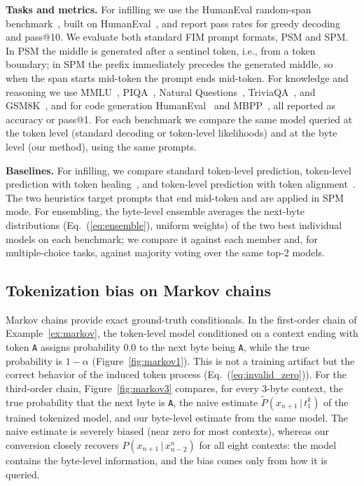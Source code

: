 \documentclass{article} %
\newcommand{\str}[1]{\texttt{#1}}
\begin{document}
\textbf{Tasks and metrics.} For infilling we use the HumanEval random-span benchmark~\citep{bavarian2022fim}, built on HumanEval~\citep{chen2021codex}, and report pass rates for greedy decoding and pass@10. We evaluate both standard FIM prompt formats, PSM and SPM. In PSM the middle is generated after a sentinel token, i.e., from a token boundary; in SPM the prefix immediately precedes the generated middle, so when the span starts mid-token the prompt ends mid-token. For knowledge and reasoning we use MMLU~\citep{hendrycks2021mmlu}, PIQA~\citep{bisk2020piqa}, Natural Questions~\citep{kwiatkowski2019nq}, TriviaQA~\citep{joshi2017triviaqa}, and GSM8K~\citep{cobbe2021gsm8k}, and for code generation HumanEval~\citep{chen2021codex} and MBPP~\citep{austin2021mbpp}, all reported as accuracy or pass@1. For each benchmark we compare the same model queried at the token level (standard decoding or token-level likelihoods) and at the byte level (our method), using the same prompts.

\textbf{Baselines.} For infilling, we compare standard token-level prediction, token-level prediction with token healing~\citep{dagan2024tokenizer}, and token-level prediction with token alignment~\citep{athiwaratkun2024alignment}. The two heuristics target prompts that end mid-token and are applied in SPM mode. For ensembling, the byte-level ensemble averages the next-byte distributions (Eq.~(\ref{eq:ensemble}), uniform weights) of the two best individual models on each benchmark; we compare it against each member and, for multiple-choice tasks, against majority voting over the same top-2 models.

\subsection{Tokenization bias on Markov chains}
\label{sec:exp_markov}
Markov chains provide exact ground-truth conditionals. In the first-order chain of Example~\ref{ex:markov}, the token-level model conditioned on a context ending with token \str{A} assigns probability $0.0$ to the next byte being \str{A}, while the true probability is $1-\alpha$ (Figure~\ref{fig:markov1}). This is not a training artifact but the correct behavior of the induced token process (Eq.~(\ref{eq:invalid_zero})). For the third-order chain, Figure~\ref{fig:markov3} compares, for every 3-byte context, the true probability that the next byte is \str{A}, the naive estimate $\tilde{P}(x_{n+1}\,|\,t_1^k)$ of the trained tokenized model, and our byte-level estimate from the same model. The naive estimate is severely biased (near zero for most contexts), whereas our conversion closely recovers $P(x_{n+1}\,|\,x_{n-2}^{n})$ for all eight contexts: the model contains the byte-level information, and the bias comes only from how it is queried.
\end{document}
